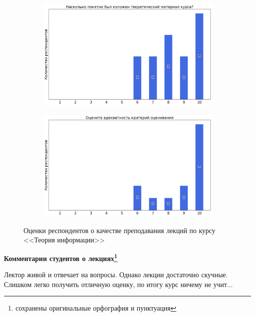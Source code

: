 \begin{figure}[H]
\begin{subfigure}[b]{0.45\textwidth}
			\end{subfigure}
			\begin{subfigure}[b]{0.45\textwidth}
				\centering
				\includegraphics[width=\textwidth]{images/4 course/Теория информации/lecturer-marks-Григорьев А.А.-2.png}
			\end{subfigure}	
			\begin{subfigure}[b]{0.45\textwidth}
				\centering
				\includegraphics[width=\textwidth]{images/4 course/Теория информации/lecturer-marks-Григорьев А.А.-3.png}
			\end{subfigure}
			\caption{Оценки респондентов о качестве преподавания лекций по курсу <<Теория информации>>}
		\end{figure}

		\textbf{Комментарии студентов о лекциях\protect\footnote{сохранены оригинальные орфография и пунктуация}}
            \begin{commentbox} 
                Лектор живой и отвечает на вопросы. Однако лекции достаточно скучные. Слишком легко получить отличную оценку, по итогу курс ничему не учит...
            \end{commentbox} 
        
